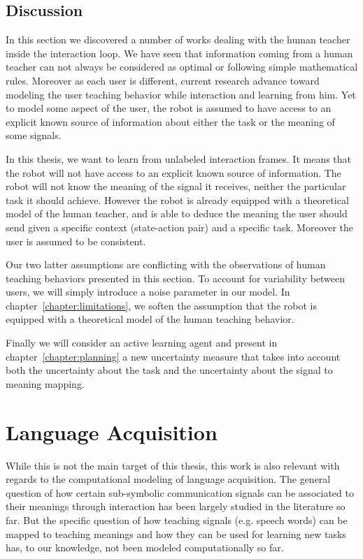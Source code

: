 \subsection{Discussion}

In this section we discovered a number of works dealing with the human teacher inside the interaction loop. We have seen that information coming from a human teacher can not always be considered as optimal or following simple mathematical rules. Moreover as each user is different, current research advance toward modeling the user teaching behavior while interaction and learning from him. Yet to model some aspect of the user, the robot is assumed to have access to an explicit known source of information about either the task or the meaning of some signals.

In this thesis, we want to learn from unlabeled interaction frames. It means that the robot will not have access to an explicit known source of information. The robot will not know the meaning of the signal it receives, neither the particular task it should achieve. However the robot is already equipped with a theoretical model of the human teacher, and is able to deduce the meaning the user should send given a specific context (state-action pair) and a specific task. Moreover the user is assumed to be consistent.

Our two latter assumptions are conflicting with the observations of human teaching behaviors presented in this section. To account for variability between users, we will simply introduce a noise parameter in our model. In chapter~\ref{chapter:limitations}, we soften the assumption that the robot is equipped with a theoretical model of the human teaching behavior.

Finally we will consider an active learning agent and present in chapter~\ref{chapter:planning} a new uncertainty measure that takes into account both the uncertainty about the task and the uncertainty about the signal to meaning mapping.

\section{Language Acquisition}
\label{chapter:related:language}

While this is not the main target of this thesis, this work is also relevant with regards to the computational modeling of language acquisition. The general question of how certain sub-symbolic communication signals can be associated to their meanings through interaction has been largely studied in the literature so far. But the specific question of how teaching signals (e.g. speech words) can be mapped to teaching meanings and how they can be used for learning new tasks has, to our knowledge, not been modeled computationally so far.

